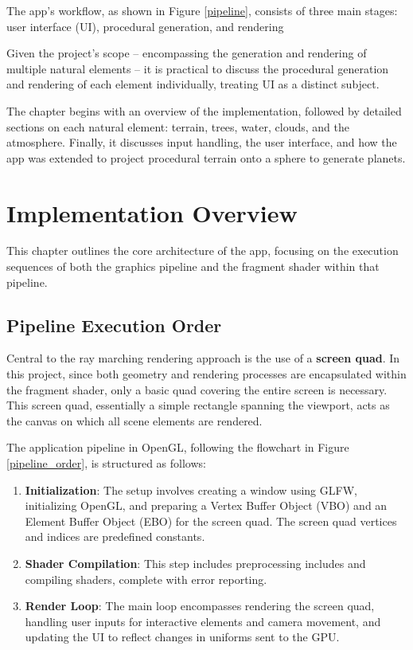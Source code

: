\label{sec:3}

The app's workflow, as shown in Figure \ref{pipeline}, consists of three main stages: user interface (UI), procedural generation, and rendering

Given the project's scope -- encompassing the generation and rendering of multiple natural elements -- it is practical to discuss the procedural generation and rendering of each element individually, treating UI as a distinct subject.

The chapter begins with an overview of the implementation, followed by detailed sections on each natural element: terrain, trees, water, clouds, and the atmosphere. Finally, it discusses input handling, the user interface, and how the app was extended to project procedural terrain onto a sphere to generate planets.

\section{Implementation Overview}
\label{Implementation Overview}

This chapter outlines the core architecture of the app, focusing on the execution sequences of both the graphics pipeline and the fragment shader within that pipeline.

\subsection{Pipeline Execution Order}

Central to the ray marching rendering approach is the use of a \textbf{screen quad}. In this project, since both geometry and rendering processes are encapsulated within the fragment shader, only a basic quad covering the entire screen is necessary. This screen quad, essentially a simple rectangle spanning the viewport, acts as the canvas on which all scene elements are rendered.

The application pipeline in OpenGL, following the flowchart in Figure \ref{pipeline_order}, is structured as follows:
\begin{enumerate}
    \item \textbf{Initialization}: The setup involves creating a window using GLFW, initializing OpenGL, and preparing a Vertex Buffer Object (VBO) and an Element Buffer Object (EBO) for the screen quad. The screen quad vertices and indices are predefined constants.
    \item \textbf{Shader Compilation}: This step includes preprocessing includes and compiling shaders, complete with error reporting.
    \item \textbf{Render Loop}: The main loop encompasses rendering the screen quad, handling user inputs for interactive elements and camera movement, and updating the UI to reflect changes in uniforms sent to the GPU.
\end{enumerate}


